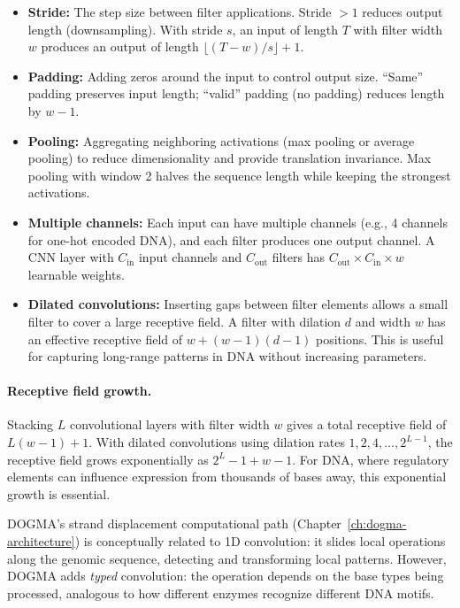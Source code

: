 \begin{itemize}[leftmargin=1.5em]
  \item \textbf{Stride:} The step size between filter applications. Stride $>1$ reduces output length (downsampling). With stride $s$, an input of length $T$ with filter width $w$ produces an output of length $\lfloor (T - w)/s \rfloor + 1$.
  \item \textbf{Padding:} Adding zeros around the input to control output size. ``Same'' padding preserves input length; ``valid'' padding (no padding) reduces length by $w - 1$.
  \item \textbf{Pooling:} Aggregating neighboring activations (max pooling or average pooling) to reduce dimensionality and provide translation invariance. Max pooling with window 2 halves the sequence length while keeping the strongest activations.
  \item \textbf{Multiple channels:} Each input can have multiple channels (e.g., 4 channels for one-hot encoded DNA), and each filter produces one output channel. A CNN layer with $C_{\text{in}}$ input channels and $C_{\text{out}}$ filters has $C_{\text{out}} \times C_{\text{in}} \times w$ learnable weights.
  \item \textbf{Dilated convolutions:} Inserting gaps between filter elements allows a small filter to cover a large receptive field. A filter with dilation $d$ and width $w$ has an effective receptive field of $w + (w-1)(d-1)$ positions. This is useful for capturing long-range patterns in DNA without increasing parameters.
\end{itemize}

\paragraph{Receptive field growth.} Stacking $L$ convolutional layers with filter width $w$ gives a total receptive field of $L(w-1) + 1$. With dilated convolutions using dilation rates $1, 2, 4, \ldots, 2^{L-1}$, the receptive field grows exponentially as $2^L - 1 + w - 1$. For DNA, where regulatory elements can influence expression from thousands of bases away, this exponential growth is essential.

\begin{keyinsight}
DOGMA's strand displacement computational path (Chapter~\ref{ch:dogma-architecture}) is conceptually related to 1D convolution: it slides local operations along the genomic sequence, detecting and transforming local patterns. However, DOGMA adds \emph{typed} convolution: the operation depends on the base types being processed, analogous to how different enzymes recognize different DNA motifs.
\end{keyinsight}

